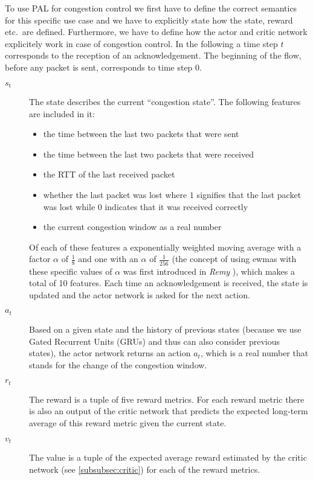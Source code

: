 \documentclass[sigconf]{acmart}
\begin{document}
To use PAL for congestion control we first have to define the correct semantics for this specific use case and we have to explicitly state how the state, reward etc.~are defined. Furthermore, we have to define how the actor and critic network explicitely work in case of congestion control. In the following a time step $t$ corresponds to the reception of an acknowledgement. The beginning of the flow, before any packet is sent, corresponds to time step $0$.

\begin{description}
\item[$\textit{s}_\text{t}$] The state  describes the current ``congestion state''. The following features are included in it:
\begin{itemize}
\item the time between the last two packets that were sent
\item the time between the last two packets that were received
\item the RTT of the last received packet
\item whether the last packet was lost where $1$ signifies that the last packet was lost while $0$ indicates that it was received correctly
\item the current congestion window as a real number
\end{itemize}
Of each of these features a exponentially weighted moving average with a factor $\alpha$ of $\frac{1}{8}$ and one with an $\alpha$ of $\frac{1}{256}$ (the concept of using ewmas with these specific values of $\alpha$ was first introduced in \textit{Remy} \cite{winstein_tcp_2013}), which makes a total of 10 features.  
Each time an acknowledgement is received, the state is updated and the actor network is asked for the next action.
\item[$\textit{a}_t$] Based on a given state and the history of previous states (because we use Gated Recurrent Units (GRUs) and thus can also consider previous states), the actor network returns an action $a_t$, which is a real number that stands for the change of the congestion window. 
\item[$\textit{r}_t$] The reward is a tuple of five reward metrics. 
For each reward metric there is also an output of the critic network that predicts the expected long-term average of this reward metric given the current state. 
\item[$\textit{v}_t$] The value is a tuple of the expected average reward estimated by the critic network (see \autoref{subsubsec:critic}) for each of the reward metrics. 
\end{description}
\end{document}
